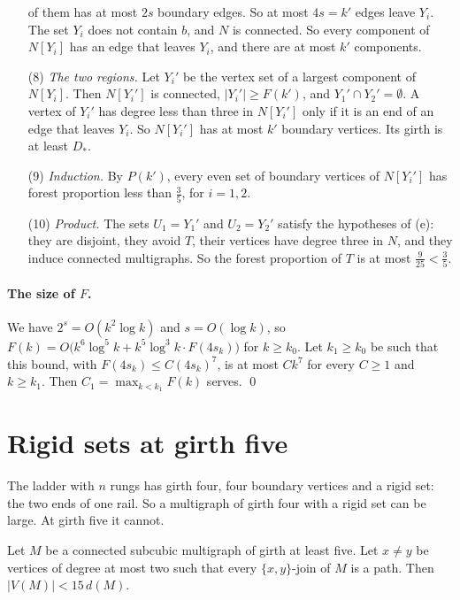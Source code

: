 \documentclass[11pt]{article}
\begin{document}
\begin{enumerate}[leftmargin=2.1em]
of them has at most $2s$ boundary edges. So at most $4s=k'$ edges leave $Y_i$. The set $Y_i$ does
not contain $b$, and $N$ is connected. So every component of $N[Y_i]$ has an edge that leaves
$Y_i$, and there are at most $k'$ components.
\item[(8)] \emph{The two regions.} Let $Y_i'$ be the vertex set of a largest component of
$N[Y_i]$. Then $N[Y_i']$ is connected, $|Y_i'|\ge F(k')$, and $Y_1'\cap Y_2'=\emptyset$. A
vertex of $Y_i'$ has degree less than three in $N[Y_i']$ only if it is an end of an edge that
leaves $Y_i$. So $N[Y_i']$ has at most $k'$ boundary vertices. Its girth is at least $D_*$.
\item[(9)] \emph{Induction.} By $P(k')$, every even set of boundary vertices of $N[Y_i']$ has
forest proportion less than $\frac35$, for $i=1,2$.
\item[(10)] \emph{Product.} The sets $U_1=Y_1'$ and $U_2=Y_2'$ satisfy the hypotheses of (e):
they are disjoint, they avoid $T$, their vertices have degree three in $N$, and they induce
connected multigraphs. So the forest proportion of $T$ is at most $\frac9{25}<\frac35$.
\end{enumerate}

\paragraph{The size of $F$.} We have $2^{s}=O(k^{2}\log k)$ and $s=O(\log k)$, so
$F(k)=O\bigl(k^{6}\log^{5}k+k^{5}\log^{3}k\cdot F(4s_k)\bigr)$ for $k\ge k_0$. Let $k_1\ge k_0$
be such that this bound, with $F(4s_k)\le C(4s_k)^{7}$, is at most $Ck^{7}$ for every $C\ge1$
and $k\ge k_1$. Then $C_1=\max_{k<k_1}F(k)$ serves. \qed

\section{Rigid sets at girth five}\label{sec:rigid}

The ladder with $n$ rungs has girth four, four boundary vertices and a rigid set: the two ends
of one rail. So a multigraph of girth four with a rigid set can be large. At girth five it
cannot.

\begin{lemma}\label{lem:fullfive}
Let $M$ be a connected subcubic multigraph of girth at least five. Let $x\ne y$ be vertices of
degree at most two such that every $\{x,y\}$-join of $M$ is a path. Then $|V(M)|<15\,d(M)$.
\end{lemma}
\end{document}
